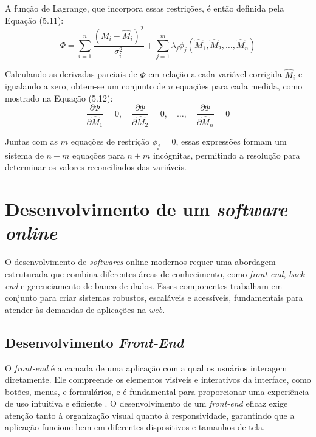 A função de Lagrange, que incorpora essas restrições, é então definida pela Equação (5.11):
\begin{equation}
	\Phi = \sum_{i=1}^n \frac{(M_i - \hat{M}_i)^2}{\sigma_i^2} + \sum_{j=1}^m \lambda_j \phi_j(\hat{M}_1, \hat{M}_2, \dots, \hat{M}_n)
\end{equation}

Calculando as derivadas parciais de $\Phi$ em relação a cada variável corrigida $\hat{M}_i$ e igualando a zero, obtem-se um conjunto de $n$ equações para cada medida, como mostrado na Equação (5.12):
\begin{equation}
	\frac{\partial \Phi}{\partial \hat{M}_1} = 0, \quad \frac{\partial \Phi}{\partial \hat{M}_2} = 0, \quad \dots, \quad \frac{\partial \Phi}{\partial \hat{M}_n} = 0
\end{equation}

Juntas com as $m$ equações de restrição $\phi_j = 0$, essas expressões formam um sistema de $n + m$ equações para $n + m$ incógnitas, permitindo a resolução para determinar os valores reconciliados das variáveis.


\section{Desenvolvimento de um \textit{software online}}

O desenvolvimento de \textit{softwares} online modernos requer uma abordagem estruturada que combina diferentes áreas de conhecimento, como \textit{front-end}, \textit{back-end} e gerenciamento de banco de dados. Esses componentes trabalham em conjunto para criar sistemas robustos, escaláveis e acessíveis, fundamentais para atender às demandas de aplicações na \textit{web}.

\subsection{Desenvolvimento \textit{Front-End}}

O \textit{front-end} é a camada de uma aplicação com a qual os usuários interagem diretamente. Ele compreende os elementos visíveis e interativos da interface, como botões, menus, e formulários, e é fundamental para proporcionar uma experiência de uso intuitiva e eficiente \cite{frontendrole}. O desenvolvimento de um \textit{front-end} eficaz exige atenção tanto à organização visual quanto à responsividade, garantindo que a aplicação funcione bem em diferentes dispositivos e tamanhos de tela.

